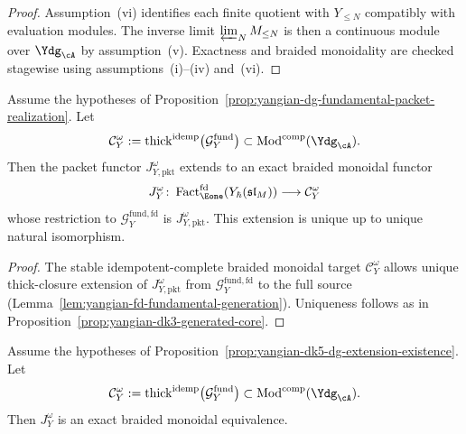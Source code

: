 \begin{proof}
Assumption~\textup{(vi)} identifies each finite quotient with
\(Y_{\le N}\) compatibly with evaluation modules.  The inverse limit
\(\varprojlim_N M_{\le N}\) is then a continuous module over
\(\Ydg_{\cA}\) by assumption~\textup{(v)}.  Exactness and braided
monoidality are checked stagewise using
assumptions~\textup{(i)}--\textup{(iv)} and~\textup{(vi)}.
\end{proof}

\begin{proposition}
\label{prop:yangian-dk5-dg-extension-existence}
Assume the hypotheses of
Proposition~\ref{prop:yangian-dg-fundamental-packet-realization}.  Let
\[
\mathcal{C}_Y^\omega
:=
\operatorname{thick}^{\mathrm{idemp}}
\bigl(\mathcal{G}^{\mathrm{fund}}_{Y}\bigr)
\subset
\operatorname{Mod}^{\mathrm{comp}}(\Ydg_{\cA}).
\]
Then the packet functor \(J_{Y,\mathrm{pkt}}^\omega\) extends to an
exact braided monoidal functor
\[
J_Y^\omega\colon
\operatorname{Fact}_{\Eone}^{\mathrm{fd}}(Y_\hbar(\mathfrak{sl}_M))
\longrightarrow
\mathcal{C}_Y^\omega
\]
whose restriction to \(\mathcal{G}^{\mathrm{fund,fd}}_{Y}\) is
\(J_{Y,\mathrm{pkt}}^\omega\).  This extension is unique up to unique
natural isomorphism.

\end{proposition}

\begin{proof}
The stable idempotent-complete braided monoidal target
\(\mathcal{C}_Y^\omega\) allows unique thick-closure extension of
\(J_{Y,\mathrm{pkt}}^\omega\) from
\(\mathcal{G}^{\mathrm{fund,fd}}_{Y}\) to the full source
(Lemma~\ref{lem:yangian-fd-fundamental-generation}).  Uniqueness
follows as in
Proposition~\ref{prop:yangian-dk3-generated-core}.
\end{proof}

\begin{proposition}
\label{prop:yangian-dk5-dg-realization-formal}
Assume the hypotheses of
Proposition~\ref{prop:yangian-dk5-dg-extension-existence}.  Let
\[
\mathcal{C}_Y^\omega
:=
\operatorname{thick}^{\mathrm{idemp}}
\bigl(\mathcal{G}^{\mathrm{fund}}_{Y}\bigr)
\subset
\operatorname{Mod}^{\mathrm{comp}}(\Ydg_{\cA}).
\]
Then \(J_Y^\omega\) is an exact braided monoidal equivalence.

\end{proposition}

